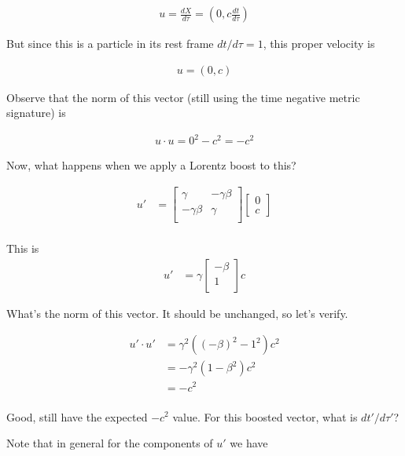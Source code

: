 \begin{align*}
u = \frac{dX}{d\tau} = \left(0, c\frac{dt}{d\tau} \right) 
\end{align*}

But since this is a particle in its rest frame $dt/d\tau = 1$, this proper velocity is

\begin{align*}
u = \left(0, c \right) 
\end{align*}

Observe that the norm of this vector (still using the time negative metric signature) is

\begin{align*}
u \cdot u = 0^2 - c^2 = -c^2
\end{align*}

Now, what happens when we apply a Lorentz boost to this?

\begin{align*}
u' &= 
\begin{bmatrix}
\gamma & - \gamma \beta \\
- \gamma \beta & \gamma \\
\end{bmatrix}
\begin{bmatrix}
0 \\
c
\end{bmatrix} \\
\end{align*}

This is
\begin{align}\label{eqn:pauli_four_vector_v:uPrime}
u' &= 
\gamma
\begin{bmatrix}
- \beta \\
1 \\
\end{bmatrix}
c
\end{align}

What's the norm of this vector.  It should be unchanged, so let's verify.

\begin{align*}
u' \cdot u' 
&= \gamma^2 \left( (- \beta)^2 - 1^2 \right) c^2 \\
&= - \gamma^2 \left( 1 - \beta^2 \right) c^2 \\
&= - c^2 \\
\end{align*}

Good, still have the expected $-c^2$ value.  For this boosted vector, what is $dt'/d\tau'$?

Note that in general for the components of $u'$ we have

